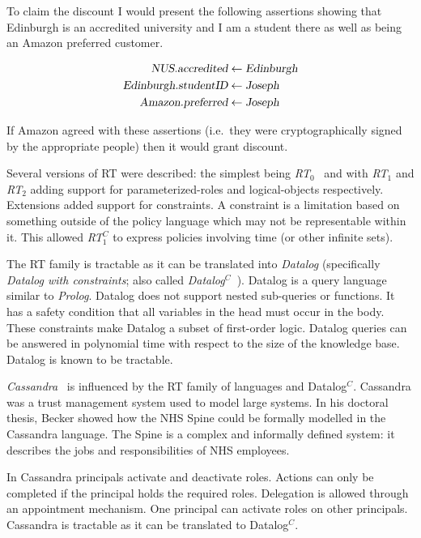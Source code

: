\documentclass[a4paper,sfsidenotes]{%
  scrartcl%
}
\begin{document}
To claim the discount I would present the following assertions showing that
Edinburgh is an accredited university and I am a student there as well as being
an Amazon preferred customer.

\begin{align*}
  \textsl{NUS.accredited}      & \gets  \textsl{Edinburgh} \\
  \textsl{Edinburgh.studentID} & \gets  \textsl{Joseph}    \\
  \textsl{Amazon.preferred}    & \gets  \textsl{Joseph}    \\
\end{align*}

If Amazon agreed with these assertions (i.e.\ they were cryptographically signed
by the appropriate people) then it would grant discount.

Several versions of RT were described: the simplest being
\emph{RT$_0$}~\cite{Li:2003tj} and with \emph{RT$_1$} and \emph{RT$_2$} adding
support for parameterized-roles and logical-objects respectively. Extensions
added support for constraints.  A constraint is a limitation based on something
outside of the policy language which may not be representable within it.  This
allowed \emph{RT$_1^C$}\cite{Li:2003ix} to express policies involving time (or
other infinite sets).

The RT family is tractable as it can be translated into
\emph{Datalog} (specifically \emph{Datalog with constraints}; also called
\emph{Datalog$^C$~\cite{Li:2003ix}}).  Datalog is a query
language similar to \emph{Prolog}. Datalog does not support nested sub-queries
or functions. It has a safety condition that all variables in the head must
occur in the body. These constraints make Datalog a subset of first-order logic.
Datalog queries can be answered in polynomial time with respect to the size of
the knowledge base. Datalog is known to be tractable. 

\emph{Cassandra}~\cite{Becker:2004fi} is influenced by the RT family of
languages and Datalog$^C$.  Cassandra was a trust management system used to
model large systems.  In his doctoral thesis, Becker showed how the NHS Spine
could be formally modelled in the Cassandra language.  The Spine is a complex
and informally defined system: it describes the jobs and responsibilities of NHS
employees.

In Cassandra principals activate and deactivate roles. Actions can only be completed if the
principal holds the required roles. Delegation is allowed through an
appointment mechanism. One principal can activate roles on other
principals. Cassandra is tractable as it can be translated
to Datalog$^C$.
\end{document}
